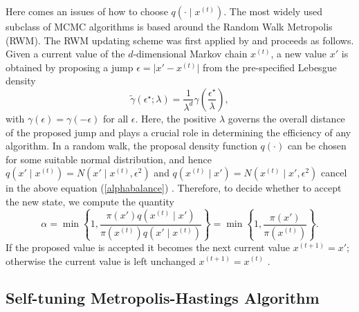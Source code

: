 Here comes an issues of how to choose $q\left(\cdot\mid x^{(t)}\right)$. The most widely used subclass of MCMC algorithms is based around the Random Walk Metropolis (RWM). The RWM updating scheme was first applied by \cite{metropolis1953equation} and proceeds as follows. Given a current value of the $d$-dimensional Markov chain $x^{(t)}$, a new value $x'$ is obtained by proposing a jump $\epsilon = \lvert x' - x^{(t)} \rvert  $ from the pre-specified Lebesgue density 
\begin{equation}\label{stepsizeep}
\tilde{\gamma}\left(\epsilon^\star;\lambda\right) = \frac{1}{\lambda^d}\gamma \left( \frac{\epsilon^\star}{\lambda} \right),
\end{equation}
with $\gamma(\epsilon) = \gamma(-\epsilon)$ for all $\epsilon$. Here, the positive $\lambda$ governs the overall distance of the proposed jump and plays a crucial role in determining the efficiency of any algorithm. In a random walk, the proposal density function $q(\cdot)$ can be chosen for some suitable normal distribution, and hence $q\left(x'\mid x^{\left(t\right)}\right)=N\left(x'\mid x^{\left(t\right)},\epsilon^2\right)$ and $q\left(x^{\left(t\right)}\mid x'\right)=N\left(x^{\left(t\right)}\mid x',\epsilon^2\right)$ cancel in the above equation (\ref{alphabalance}) \citep{sherlock2016adaptive}. Therefore, to decide whether to accept the new state, we compute the quantity
\begin{equation}
\alpha=\min \left\lbrace 1,\frac{\pi\left(x'\right) q\left( x^{\left(t\right)}\mid x'\right) }{\pi\left(x^{\left(t\right)}\right)  q\left( x'\mid x^{\left(t\right)} \right) }  \right\rbrace= \min \left\lbrace 1,\frac{\pi\left(x'\right)  }{\pi\left(x^{\left(t\right)}\right) }  \right\rbrace.
\end{equation}
If the proposed value is accepted it becomes the next current value $x^{(t+1)}= x'$; otherwise the current value is left unchanged $x^{(t+1)} = x^{(t)}$ \citep{sherlock2010random}. 


\subsection{Self-tuning Metropolis-Hastings Algorithm}

